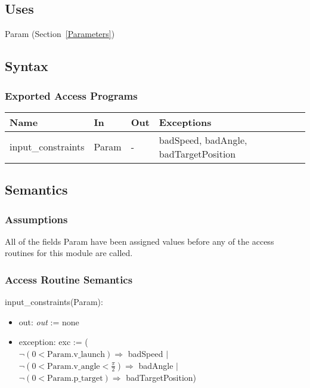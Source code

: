 \documentclass[12pt, titlepage]{article}
\begin{document}
\subsection{Uses}

Param (Section~\ref{Parameters})

\subsection{Syntax}

\subsubsection{Exported Access Programs}

\begin{center}
 \begin{tabular}{p{3cm} p{3cm} p{1cm} p{8cm}}
 \hline
 \textbf{Name} & \textbf{In} & \textbf{Out} & \textbf{Exceptions} \\
 \hline
 input\_constraints & Param & - & badSpeed, badAngle, badTargetPosition \\
 \hline
 \end{tabular}
 \end{center}

\subsection{Semantics}

\subsubsection{Assumptions}

All of the fields Param have been assigned values before any of the access
 routines for this module are called.

\subsubsection{Access Routine Semantics}

input\_constraints(Param):
 \begin{itemize}
 \item out: \textit{out} := none
 \item exception: exc := ( \\
 $\neg (0 < \text{Param.v\_launch}) \Rightarrow$ badSpeed $|$\\
 $\neg (0 < \text{Param.v\_angle} < \frac{\pi}{2}) \Rightarrow$ badAngle $|$\\
 $\neg (0 < \text{Param.p\_target}) \Rightarrow$ badTargetPosition)
 \end{itemize}
\end{document}
